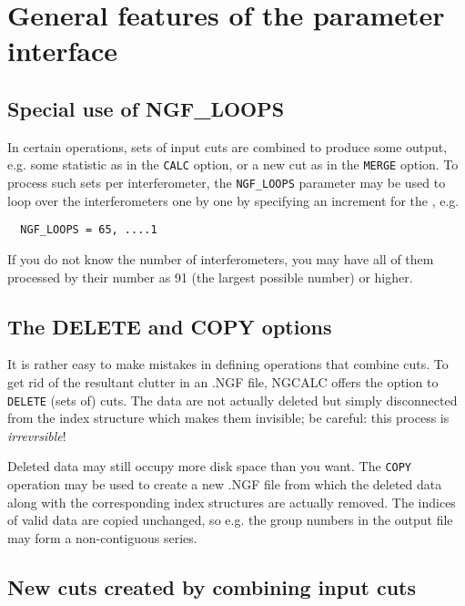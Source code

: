  


\section{ General features of the parameter interface}
\label{.general.features}

\subsection{ Special use of NGF\_LOOPS} 
\label{.loops}

        In certain operations, sets of input cuts are combined to produce some
output, e.g. some statistic as in the \verb/CALC/ option, or a new cut as in
the \verb/MERGE/ option. To process such sets per interferometer, the
\verb/NGF_LOOPS/ parameter may be used to loop over the interferometers one by
one by specifying an increment for the ,
e.g.

\verb/  NGF_LOOPS = 65, ....1/

If you do not know the number of interferometers, you may have all of them
processed by their number as 91 (the largest possible number) or higher.


\subsection{ The DELETE and COPY options}
\label{.delete}

        It is rather easy to make mistakes in defining operations that combine
cuts. To get rid of the resultant clutter in an .NGF file, NGCALC offers the
option to \verb/DELETE/ (sets of) cuts. The data are not actually deleted but
simply disconnected from the index structure which makes them invisible; be
careful: this process is {\em irrevrsible}!

        Deleted data may still occupy more disk space than you want. The
\verb/COPY/ operation may be used to create a new .NGF file from which the
deleted data along with the corresponding index structures are actually
removed.  The indices of valid data are copied unchanged, so e.g. the group
numbers in the output file may form a non-contiguous series.


\subsection{New cuts created by combining input cuts}
\label{.combine}

